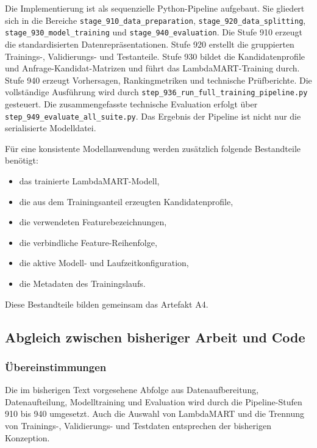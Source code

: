 \label{subsec:technische_umsetzung_artefaktueberfuehrung} 

Die Implementierung ist als sequenzielle Python-Pipeline aufgebaut. Sie gliedert sich in die Bereiche \texttt{stage\_910\_data\_preparation}, \texttt{stage\_920\_data\_splitting}, \texttt{stage\_930\_model\_training} und \texttt{stage\_940\_evaluation}. 
Die Stufe 910 erzeugt die standardisierten Datenrepräsentationen. Stufe 920 erstellt die gruppierten Trainings-, Validierungs- und Testanteile. Stufe 930 bildet die Kandidatenprofile und Anfrage-Kandidat-Matrizen und führt das LambdaMART-Training durch. 
Stufe 940 erzeugt Vorhersagen, Rankingmetriken und technische Prüfberichte. Die vollständige Ausführung wird durch \texttt{step\_936\_run\_full\_training\_pipeline.py} gesteuert. 
Die zusammengefasste technische Evaluation erfolgt über \texttt{step\_949\_evaluate\_all\_suite.py}. Das Ergebnis der Pipeline ist nicht nur die serialisierte Modelldatei. 

Für eine konsistente Modellanwendung werden zusätzlich folgende Bestandteile benötigt: 

\begin{itemize} 
    \item das trainierte LambdaMART-Modell, 
    \item die aus dem Trainingsanteil erzeugten Kandidatenprofile, 
    \item die verwendeten Featurebezeichnungen, 
    \item die verbindliche Feature-Reihenfolge, 
    \item die aktive Modell- und Laufzeitkonfiguration, 
    \item die Metadaten des Trainingslaufs. 
\end{itemize} 

Diese Bestandteile bilden gemeinsam das Artefakt A4. 

\subsection{Abgleich zwischen bisheriger Arbeit und Code} 

\label{subsec:abgleich_artefaktueberfuehrung} 
\subsubsection*{Übereinstimmungen} 

Die im bisherigen Text vorgesehene Abfolge aus Datenaufbereitung, Datenaufteilung, Modelltraining und Evaluation wird durch die Pipeline-Stufen 910 bis 940 umgesetzt. 
Auch die Auswahl von LambdaMART und die Trennung von Trainings-, Validierungs- und Testdaten entsprechen der bisherigen Konzeption. 


